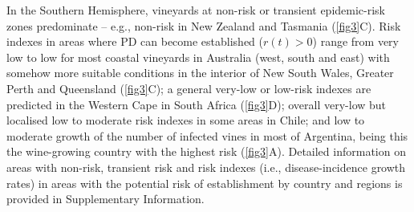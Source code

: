     \begin{table}[H]
        \begin{center}
            \caption{\textbf{Validation of model predictions.} The items are
                locations
                where PD was present or absent. TP corresponds to true
                positives and TN to true
                negatives according to our model with $R_0=8$. }
            \label{tab:validation}
        \end{center}
    \end{table}

    In the Southern Hemisphere, vineyards at non-risk or transient
    epidemic-risk
    zones predominate -- e.g., non-risk in New Zealand and Tasmania
    (\cref{fig3}C).
    Risk indexes in areas where PD can become established ($r(t) > 0$) range
    from
    very low to low for most coastal vineyards in Australia (west, south and
    east)
    with somehow more suitable conditions in the interior of New South Wales,
    Greater Perth and Queensland (\cref{fig3}C); a general very-low or low-risk
    indexes are predicted in the Western Cape in South Africa (\cref{fig3}D);
    overall very-low but localised low to moderate risk indexes in some areas
    in
    Chile; and low to moderate growth of the number of infected vines in most
    of
    Argentina, being this the wine-growing country with the highest risk
    (\cref{fig3}A). Detailed information on areas with non-risk, transient risk
    and
    risk indexes (i.e., disease-incidence growth rates) in areas with the
    potential
    risk of establishment by country and regions is provided in Supplementary
    Information.

